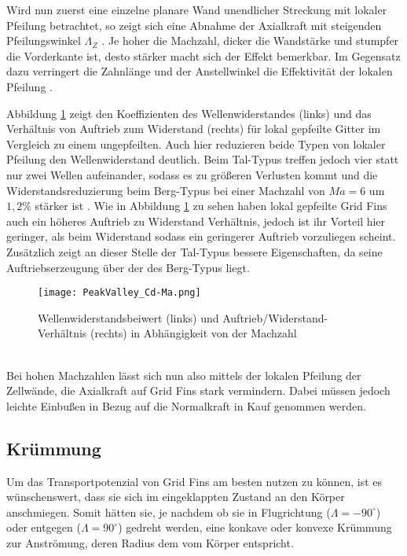 Wird nun zuerst eine einzelne planare Wand unendlicher Streckung mit lokaler Pfeilung betrachtet, so zeigt sich eine Abnahme der Axialkraft mit steigenden Pfeilungswinkel $\Lambda_Z$ \cite{PeakValley}. Je hoher die Machzahl, dicker die Wandstärke und stumpfer die Vorderkante ist, desto stärker macht sich der Effekt bemerkbar. Im Gegensatz dazu verringert die Zahnlänge und der Anstellwinkel die Effektivität der lokalen Pfeilung \cite{PeakValley}.

Abbildung \ref{abb_PeakValley-Ma} zeigt den Koeffizienten des Wellenwiderstandes (links) und das Verhältnis von Auftrieb zum Widerstand (rechts) für lokal gepfeilte Gitter im Vergleich zu einem ungepfeilten.
Auch hier reduzieren beide Typen von lokaler Pfeilung den Wellenwiderstand deutlich. Beim Tal-Typus treffen jedoch vier statt nur zwei Wellen aufeinander, sodass es zu größeren Verlusten kommt und die Widerstandsreduzierung beim Berg-Typus bei einer Machzahl von $Ma=6$ um $1,2\%$ stärker ist \cite{PeakValley}.
Wie in Abbildung \ref{abb_PeakValley-Ma} zu sehen haben lokal gepfeilte Grid Fins auch ein höheres Auftrieb zu Widerstand Verhältnis, jedoch ist ihr Vorteil hier geringer, als beim Widerstand sodass ein geringerer Auftrieb vorzuliegen scheint. Zusätzlich zeigt an dieser Stelle der Tal-Typus bessere Eigenschaften, da seine Auftriebserzeugung über der des Berg-Typus liegt. 
\begin{figure}[h]
	\centering
	\texttt{[image: PeakValley\_Cd-Ma.png]}
	\caption{Wellenwiderstandsbeiwert (links) und Auftrieb/Widerstand-Verhältnis (rechts) in Abhängigkeit von der Machzahl}
	\label{abb_PeakValley-Ma}
\end{figure}\\
Bei hohen Machzahlen lässt sich nun also mittels der lokalen Pfeilung der Zellwände, die Axialkraft auf Grid Fins stark vermindern. Dabei müssen jedoch leichte Einbußen in Bezug auf die Normalkraft in Kauf genommen werden.
\subsection{Krümmung}
Um das Transportpotenzial von Grid Fins am besten nutzen zu können, ist es wünschenswert, dass sie sich im eingeklappten Zustand an den Körper anschmiegen. Somit hätten sie, je nachdem ob sie in Flugrichtung ($\Lambda = -90^\circ$) oder entgegen ($\Lambda = 90^\circ$) gedreht werden, eine konkave oder konvexe Krümmung zur Anströmung, deren Radius dem vom Körper entspricht.

